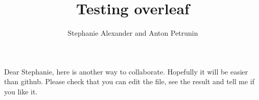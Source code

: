 \documentclass{article}
\begin{document}
 
\title{Testing overleaf}
\author{Stephanie Alexander and Anton Petrunin}
\date{}
\maketitle

Dear Stephanie, here is another way to collaborate.
Hopefully it will be easier than github.
Please check that you can edit the file, see the result and tell me if you like it.
\end{document}
